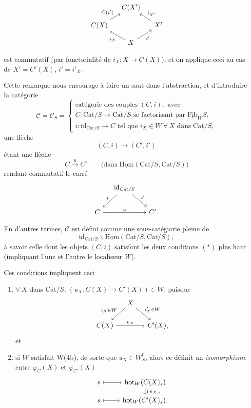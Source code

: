 \documentclass[11pt]{article}
\newcommand{\printedpage}[1]{\marginpar{\footnotesize p.~#1}}
\newcommand{\msp}[1]{\marginpar{\footnotesize [#1]}}
\newcommand{\Hom}{\underline{\mathrm{Hom}}}
\newcommand{\Fib}{\underline{\mathrm{Fib}}}
\newcommand{\Cat}{\mathrm{Cat}}
\newcommand{\hot}{\mathrm{hot}}
\newcommand{\id}{\mathrm{id}}
\begin{document}
\printedpage{130}

\[
\begin{tikzcd}[column sep=small, row sep=small]
 & C(X') & \\
C(X) \arrow[ur, "C(i')"] & & X' \arrow[ul, "i_{X'}"'] \\
 & X \arrow[ul, "i_X"] \arrow[ur, "i'"'] &
\end{tikzcd}
\]

est commutatif (par fonctorialité de $i_X : X \longrightarrow C(X)$), et on applique ceci au cas de $X' = C'(X)$, $i' = i'_X$.

Cette remarque nous encourage à faire un saut dans l'abstraction, et d'introduire la catégorie\msp{page 198}
\[
\mathcal{C} = \mathcal{C}_S = \begin{cases}
\text{catégorie des couples } (C,i), \text{ avec} \\
C : \Cat/S \longrightarrow \Cat/S \text{ se factorisant par } \Fib_W S, \\
i : \id_{\Cat/S} \longrightarrow C \text{ tel que } i_X \in W \ \forall\ X \text{ dans } \Cat/S,
\end{cases}
\tag*{$(*)$}
\]
une flèche
\[
(C,i) \longrightarrow (C',i')
\]
étant une flèche
\[
C \xrightarrow{u} C' \qquad \text{(dans } \Hom(\Cat/S, \Cat/S))
\]
rendant commutatif le carré
\[
\begin{tikzcd}[column sep=small]
 & \id_{\Cat/S} \arrow[dl, "i"'] \arrow[dr, "i'"] & \\
C \arrow[rr, "u"] & & C'.
\end{tikzcd}
\]

En d'autres termes, $\mathcal{C}$ est défini comme une sous-catégiorie pleine de %
\[
\id_{\Cat/S}\backslash\Hom(\Cat/S, \Cat/S),
\]
à savoir celle dont les objets $(C,i)$ satisfont les deux conditions $(*)$ plus haut (impliquant l'une et l'autre le localiseur $W$).

\msp{page 199}Ces conditions impliquent ceci

\begin{enumerate}
\item[a)] $\forall\ X$ dans Cat/$S$, $(u_X : C(X) \longrightarrow C'(X)) \in W$, puisque
\[
\begin{tikzcd}[column sep=small]
 & X \arrow[dl, "i_X\in W"'] \arrow[dr, "i'_X\in W"] & \\
C(X) \arrow[rr, "u_X"] & & C'(X),
\end{tikzcd}
\]
\printedpage{131}
et

\item[b)] si $W$ satisfait W(4b), de sorte que $u_X \in W^{\mathrm{f}}_S$, alors ce définit un \textit{isomorphisme} entre $\varphi_C(X)$ et $\varphi_{C'}(X)$ %
\[
\begin{tikzcd}[row sep=small]
s \arrow[r, mapsto] & \hot_W(C(X)_s) \arrow[d, "\wr\, u_{X,s}"] \\
s \arrow[r, mapsto] & \hot_W(C'(X)_s).
\end{tikzcd}
\]
\end{enumerate}
\end{document}
